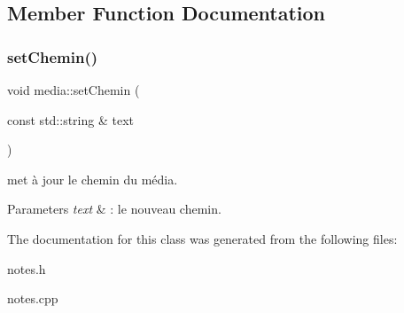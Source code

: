 \subsection{Member Function Documentation}
\mbox{\label{classmedia_a9e44b8025a205867c9f853d160da1f6e}} 
\subsubsection{\texorpdfstring{set\+Chemin()}{setChemin()}}
{\footnotesize\ttfamily void media\+::set\+Chemin (\begin{DoxyParamCaption}\item[{const std\+::string \&}]{text }\end{DoxyParamCaption})\hspace{0.3cm}{\ttfamily [inline]}}



met à jour le chemin du média. 


\begin{DoxyParams}{Parameters}
{\em text} & \+: le nouveau chemin. \\
\hline
\end{DoxyParams}


The documentation for this class was generated from the following files\+:\begin{DoxyCompactItemize}
\item 
notes.\+h\item 
notes.\+cpp\end{DoxyCompactItemize}
